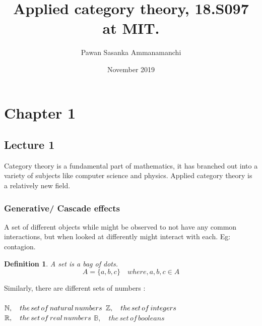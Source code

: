 \documentclass{article}
\title{Applied category theory, 18.S097 at MIT. }
\author{Pawan Sasanka Ammanamanchi }
\date{November 2019}
\newtheorem{defn}[thm]{Definition} %
\begin{document}
\maketitle
\newpage
\tableofcontents
\newpage
\section{Chapter 1}
\subsection{Lecture 1}
Category theory is a fundamental part of mathematics, it has branched out into a variety of subjects like computer science and physics. Applied category theory is a relatively new field. 
\subsubsection{Generative/ Cascade effects}
A set of different objects while might be observed to not have any common interactions, but when looked at differently might interact with each. Eg: contagion.
\begin{defn}
A set is a bag of dots. 
\begin{equation*}
    A = \{ a,b,c \} \quad where, a, b, c \in A
\end{equation*}
\end{defn}
Similarly, there are different sets of numbers :\\
\\
    $\mathbb{N}, \quad the\, set\, of\, natural\, numbers \\$
    $\mathbb{Z}, \quad the\, set\, of\, integers \\$
    $\mathbb{R}, \quad the\, set\, of\, real\, numbers \\$
    $\mathbb{B}, \quad the\, set\, of\, booleans $ 
    
\end{document}
